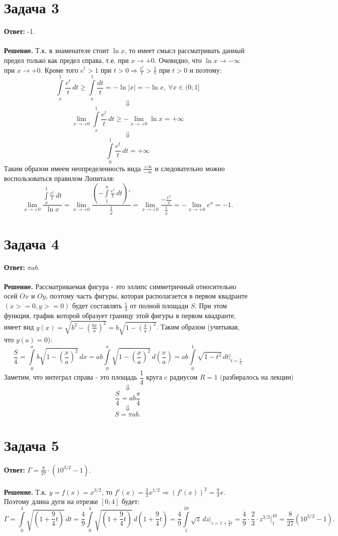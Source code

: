 \documentclass{article}
\begin{document}
\section*{Задача 3}
{\bf Ответ:} -1.
\\
\\
{\bf Решение.} Т.к. в знаменателе стоит $\ln x$, то имеет смысл рассматривать данный предел только как предел справа, т.е. при $x\rightarrow+0$. Очевидно, что $\ln x\rightarrow -\infty$ при $x\rightarrow +0$.  Кроме того $e^t > 1$ при $t > 0 \Rightarrow \frac{e^t}{t} > \frac{1}{t}$ при $t>0$ и поэтому:
$$\int\limits_x^1 \frac{e^t}{t}\,dt \geq \int\limits_x^1 \frac{dt}{t} =-\ln |x| = -\ln x,\ \forall x\in (0; 1]$$
$$\Downarrow$$
$$\lim_{x\rightarrow+0}\int\limits_x^1\frac{e^t}{t}\, dt \geq -\lim_{x\rightarrow +0} \ln x = + \infty$$
$$\Downarrow$$
$$\int\limits_0^1\frac{e^t}{t}\, dt = +\infty$$
Таким образом имеем неопределенность вида $\frac{+\infty}{-\infty}$ и следовательно можно воспользоваться правилом Лопиталя:
$$\lim_{x\rightarrow +0}\frac{\int\limits_x^1\frac{e^t}{t}\, dt}{\ln x}=\lim_{x\rightarrow +0}\frac{\left(-\int\limits_1^x\frac{e^t}{t}\,dt\right)'}{\frac{1}{x}}=\lim_{x\rightarrow+0}\frac{-\frac{e^x}{x}}{\frac{1}{x}}=-\lim_{x\rightarrow+0} e^x = -1.$$
\section*{Задача 4}
{\bf Ответ:} $\pi ab$.
\\
\\
{\bf Решение.} Рассматриваемая фигура - это эллипс симметричный относительно осей $Ox$ и $Oy$, поэтому часть фигуры, которая располагается в первом квадранте $(x>=0, y>=0)$ будет составлять $\frac{1}{4}$ от полной площади $S$. При этом функция, график которой образует границу этой фигуры в первом квадранте, имеет вид $y(x) = \sqrt{b^2-\left(\frac{bx}{a}\right)^2}=b\sqrt{1-\left(\frac{x}{a}\right)^2}$. Таким образом (учитывая, что $y(a)=0$):
$$\frac{S}{4}=\int\limits_0^a b\sqrt{1-\left(\frac{x}{a}\right)^2}\, dx=ab\int\limits_0^a \sqrt{1-\left(\frac{x}{a}\right)^2}\, d\left(\frac{x}{a}\right)=ab\int\limits_0^1 \sqrt{1-t^2}\,dt\bigg|_{t=\frac{x}{a}}$$
$$\textrm{Заметим, что интеграл справа - это площадь $\frac{1}{4}$ круга c радиусом $R=1$ (разбиралось на лекции)}$$
$$\Downarrow$$
$$\frac{S}{4} = ab\frac{\pi}{4}$$
$$\Downarrow$$
$$S=\pi ab.$$
\section*{Задача 5}
{\bf Ответ:} $\Gamma=\frac{8}{27}\cdot(10^{3/2}-1)$.
\\
\\
{\bf Решение.} Т.к. $y=f(x)=x^{3/2}$, то $f'(x)=\frac{3}{2}x^{1/2}\Rightarrow \left(f'(x)\right)^2=\frac{9}{4}x$. Поэтому длина дуги на отрезке $[0;4]$ будет:
$$\Gamma=\int\limits_0^4 \sqrt{\left(1+\frac{9}{4}t\right)}\, dt = \frac{4}{9}\int\limits_0^4 \sqrt{\left(1+\frac{9}{4}t\right)}\, d\left(1+\frac{9}{4}t\right)=\frac{4}{9}\int\limits_1^{10}\sqrt{z}\, dz\bigg|_{z=1+\frac{9}{4}t}=\frac{4}{9}\cdot\frac{2}{3}\cdot z^{3/2}\bigg|_1^{10}=\frac{8}{27}(10^{3/2}-1).$$
\end{document}
